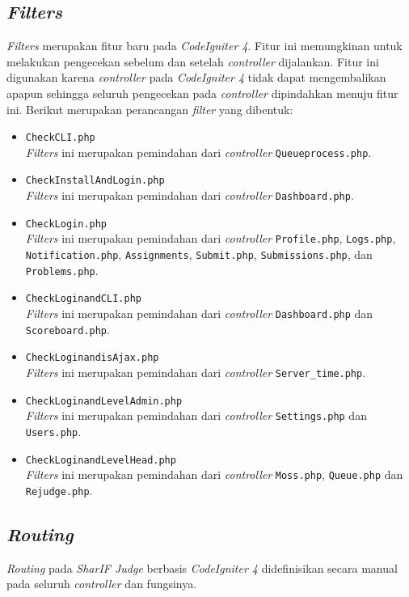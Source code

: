 \subsection{\textit{Filters}}
\textit{Filters} merupakan fitur baru pada \textit{CodeIgniter 4}. Fitur ini memungkinan untuk melakukan pengecekan sebelum dan setelah \textit{controller} dijalankan. Fitur ini digunakan karena \textit{controller} pada \textit{CodeIgniter 4} tidak dapat mengembalikan apapun sehingga seluruh pengecekan pada \textit{controller}  dipindahkan menuju fitur ini. Berikut merupakan perancangan \textit{filter} yang dibentuk:
\begin{itemize}
	\item \texttt{CheckCLI.php} \\
	\textit{Filters} ini merupakan pemindahan dari \textit{controller} \texttt{Queueprocess.php}.
	\item \texttt{CheckInstallAndLogin.php}\\
	\textit{Filters} ini merupakan pemindahan dari \textit{controller} \texttt{Dashboard.php}.
	\item \texttt{CheckLogin.php}\\
	\textit{Filters} ini merupakan pemindahan dari \textit{controller} \texttt{Profile.php}, \texttt{Logs.php}, \texttt{Notification.php}, \texttt{Assignments}, \texttt{Submit.php}, \texttt{Submissions.php}, dan \texttt{Problems.php}.
	\item \texttt{CheckLoginandCLI.php}\\
	\textit{Filters} ini merupakan pemindahan dari \textit{controller} \texttt{Dashboard.php} dan \texttt{Scoreboard.php}.
	\item \texttt{CheckLoginandisAjax.php}\\
	\textit{Filters} ini merupakan pemindahan dari \textit{controller} \texttt{Server\_time.php}.
	\item \texttt{CheckLoginandLevelAdmin.php}\\
	\textit{Filters} ini merupakan pemindahan dari \textit{controller} \texttt{Settings.php} dan \texttt{Users.php}.
	\item \texttt{CheckLoginandLevelHead.php}\\
	\textit{Filters} ini merupakan pemindahan dari \textit{controller} \texttt{Moss.php}, \texttt{Queue.php} dan \texttt{Rejudge.php}.
\end{itemize}

\subsection{\textit{Routing}}
\textit{Routing} pada \textit{SharIF Judge} berbasis \textit{CodeIgniter 4} didefinisikan secara manual pada seluruh \textit{controller} dan fungsinya.

